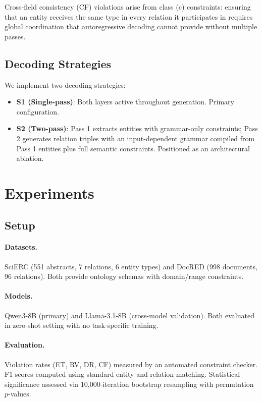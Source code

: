 \documentclass[11pt,a4paper]{article}
\begin{document}
Cross-field consistency (CF) violations arise from class (c) constraints: ensuring that an entity receives the same type in every relation it participates in requires global coordination that autoregressive decoding cannot provide without multiple passes.

\subsection{Decoding Strategies}
\label{sec:strategies}

We implement two decoding strategies:
\begin{itemize}
\item \textbf{S1 (Single-pass)}: Both layers active throughout generation. Primary configuration.
\item \textbf{S2 (Two-pass)}: Pass 1 extracts entities with grammar-only constraints; Pass 2 generates relation triples with an input-dependent grammar compiled from Pass 1 entities plus full semantic constraints. Positioned as an architectural ablation.
\end{itemize}

\section{Experiments}
\label{sec:experiments}

\subsection{Setup}
\label{sec:setup}

\paragraph{Datasets.} SciERC (551 abstracts, 7 relations, 6 entity types) and DocRED (998 documents, 96 relations). Both provide ontology schemas with domain/range constraints.

\paragraph{Models.} Qwen3-8B (primary) and Llama-3.1-8B (cross-model validation). Both evaluated in zero-shot setting with no task-specific training.

\paragraph{Evaluation.} Violation rates (ET, RV, DR, CF) measured by an automated constraint checker. F1 scores computed using standard entity and relation matching. Statistical significance assessed via 10,000-iteration bootstrap resampling with permutation $p$-values.
\end{document}
